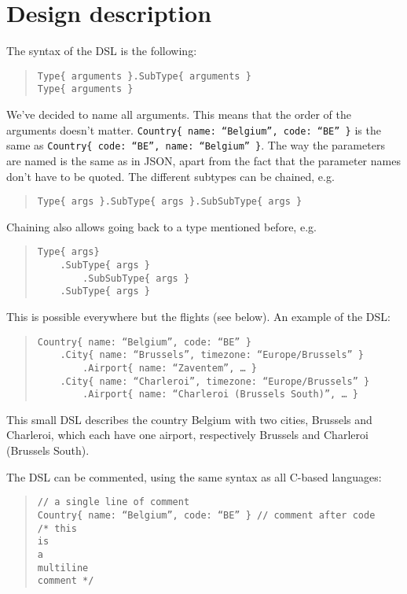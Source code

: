 \documentclass[a4paper,11pt]{article}
\newcommand{\npar}{\par \vspace{2.3ex plus 0.3ex minus 0.3ex} \noindent}
\newcommand{\dslcode}[1]{\texttt{#1}}
\begin{document}
\section{Design description}
The syntax of the DSL is the following:
\begin{quote}
\begin{verbatim}	
Type{ arguments }.SubType{ arguments }		
Type{ arguments }
\end{verbatim}
\end{quote}
We’ve decided to name all arguments. This means that the order of the arguments doesn’t matter. \dslcode{Country\{ name: “Belgium”, code: “BE” \}} is the same as \dslcode{Country\{ code: “BE”, name: “Belgium” \}}. The way the parameters are named is the same as in JSON, apart from the fact that the parameter names don’t have to be quoted.
The different subtypes can be chained, e.g.
\begin{quote}\begin{verbatim}
Type{ args }.SubType{ args }.SubSubType{ args }
\end{verbatim}\end{quote}
Chaining also allows going back to a type mentioned before, e.g.
\begin{quote}\begin{verbatim}
Type{ args}
    .SubType{ args }
        .SubSubType{ args }
    .SubType{ args }
\end{verbatim}\end{quote}
This is possible everywhere but the flights (see below).
An example of the DSL:
\begin{quote}\begin{verbatim}
Country{ name: “Belgium”, code: “BE” }
    .City{ name: “Brussels”, timezone: “Europe/Brussels” }
        .Airport{ name: “Zaventem”, … }
    .City{ name: “Charleroi”, timezone: “Europe/Brussels” }
        .Airport{ name: “Charleroi (Brussels South)”, … }
\end{verbatim}\end{quote}
This small DSL describes the country Belgium with two cities, Brussels and Charleroi, which each have one airport, respectively Brussels and Charleroi (Brussels South).

\npar The DSL can be commented, using the same syntax as all C-based languages:
\begin{quote}\begin{verbatim}
// a single line of comment
Country{ name: “Belgium”, code: “BE” } // comment after code
/* this
is
a
multiline
comment */
\end{verbatim}\end{quote}
\end{document}
